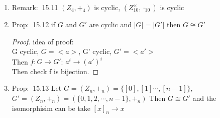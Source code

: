 \documentclass[12pt]{article}
\newcommand{\prop}{{\color{blue} Prop: $\ $}}
\newcommand{\rem}{{\color{blue} Remark: $\ $}}
\begin{document}
\begin{enumerate}
\begin{enumerate}
        \item \rem 15.11 $(Z_4, +_4)$ is cyclic, $(Z_10^{\times}, \cdot_10)$ is cyclic
        \item \prop 15.12 if $G$ and $G'$ are cyclic and $|G| = |G'|$ then $G\cong G'$ 
        \begin{proof}
            idea of proof: \\
            G cyclic, $G = <a>$, G' cyclic, $G' =<a'>$ \\
            Then $f: G \rightarrow G'$: $a^i \rightarrow (a')^i$\\
            Then check f is bijection.
        \end{proof}
        \item \prop 15.13 Let $G = (Z_n, +_n) = \{[0], [1] \cdots, [n-1]\}$, $G' = (Z_n, +_n) = (\{0,1,2,\cdots, n-1\}, +_n)$
        Then $G\cong G'$ and the isomorphisim can be take $[x]_n \rightarrow x$

    \end{enumerate}


\end{enumerate}
\end{document}
